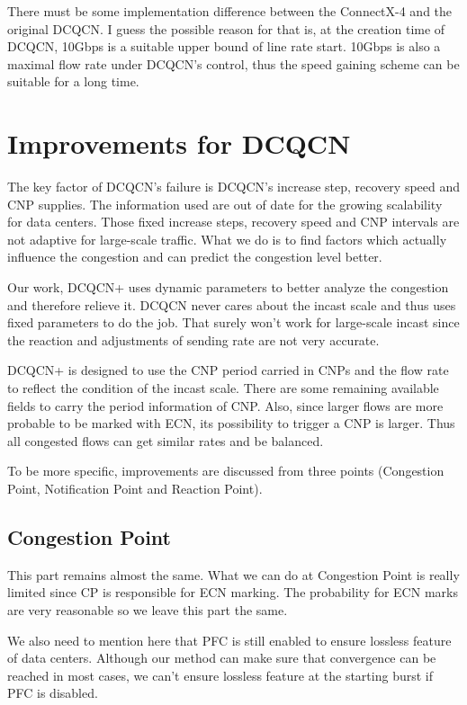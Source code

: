 \documentclass[12pt,a4paper]{article}
\begin{document}
There must be some implementation difference between the ConnectX-4 and the original DCQCN.
I guess the possible reason for that is, at the creation time of DCQCN, 10Gbps is a suitable upper bound of line rate start.
10Gbps is also a maximal flow rate under DCQCN's control, thus the speed gaining scheme can be suitable for a long time.

\section{Improvements for DCQCN}

The key factor of DCQCN's failure is DCQCN's increase step, recovery speed and CNP supplies.
The information used are out of date for the growing scalability for data centers.
Those fixed increase steps, recovery speed and CNP intervals are not adaptive for large-scale traffic.
What we do is to find factors which actually influence the congestion and can predict the congestion level better.

Our work, DCQCN+ uses dynamic parameters to better analyze the congestion and therefore relieve it.
DCQCN never cares about the incast scale and thus uses fixed parameters to do the job.
That surely won't work for large-scale incast since the reaction and adjustments of sending rate are not very accurate.

DCQCN+ is designed to use the CNP period carried in CNPs and the flow rate to reflect the condition of the incast scale.
There are some remaining available fields to carry the period information of CNP.
Also, since larger flows are more probable to be marked with ECN, its possibility to trigger a CNP is larger.
Thus all congested flows can get similar rates and be balanced.

To be more specific, improvements are discussed from three points (Congestion Point, Notification Point and Reaction Point).

\subsection{Congestion Point}

This part remains almost the same.
What we can do at Congestion Point is really limited since CP is responsible for ECN marking.
The probability for ECN marks are very reasonable so we leave this part the same.

We also need to mention here that PFC is still enabled to ensure lossless feature of data centers.
Although our method can make sure that convergence can be reached in most cases, we can't ensure lossless feature at the starting burst
if PFC is disabled.
\end{document}
